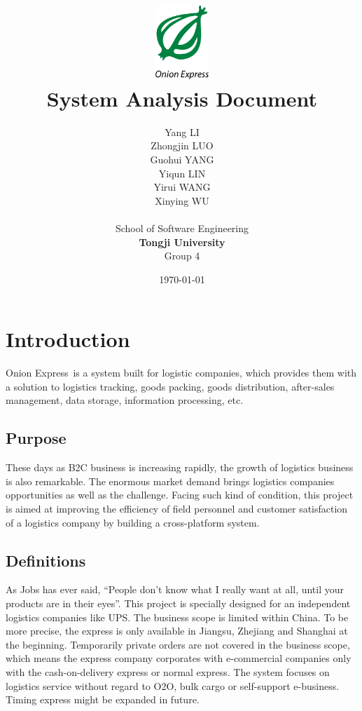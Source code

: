 \documentclass[12pt]{scrreprt}
\title{
\includegraphics[width=0.8in]{DocumentRes/OnionExpress.png} \\
\vspace*{1in}
\textbf{System Analysis Document}}
\author{Yang LI\\
        Zhongjin LUO\\
        Guohui YANG\\
        Yiqun LIN\\
        Yirui WANG\\
        Xinying WU\\
		    \vspace*{0.5in} \\
		    School of Software Engineering\\
        \textbf{Tongji University}\\
        Group 4\\
}
\date{\today}
\begin{document}


\maketitle
\tableofcontents

\chapter{Introduction}
Onion Express\textregistered\ is a system built for logistic companies, which provides them with a solution to logistics tracking, goods packing, goods distribution, after-sales management, data storage, information processing, etc.

\section{Purpose}
These days as B2C business is increasing rapidly, the growth of logistics business is also remarkable. The enormous market demand brings logistics companies opportunities as well as the challenge. Facing such kind of condition, this project is aimed at improving the efficiency of field personnel and customer satisfaction of a logistics company by building a cross-platform system.

\section{Definitions}
As Jobs has ever said, “People don't know what I really want at all, until your products are in their eyes”. This project is specially designed for an independent logistics companies like UPS. The business scope is limited within China. To be more precise, the express is only available in Jiangsu, Zhejiang and Shanghai at the beginning. Temporarily private orders are not covered in the business scope, which means the express company corporates with e-commercial companies only with the cash-on-delivery express or normal express. The system focuses on logistics service without regard to O2O, bulk cargo or self-support e-business. Timing express might be expanded in future.
\end{document}
